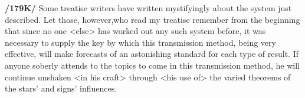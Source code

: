 \textbf{/179K/} Some treatise writers have written mystifyingly about the system just described. Let those,
however,who read my treatise remember from the beginning that since no one <else> has worked out any such system before, it was necessary to supply the key by which this transmission method, being very effective, will make forecasts of an astonishing standard for each type of result. If anyone soberly attends to the topics to come in this transmission method, he will continue unshaken <in his craft> through <his use of> the varied theorems of the stars’ and signs’ influences.

\newpage